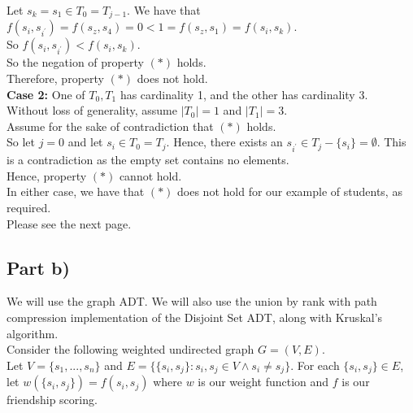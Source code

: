 \documentclass[12pt]{article}
\begin{document}
Let $s_k = s_1 \in T_0 = T_{j-1}$. We have that $f(s_i, s_{i^\prime}) = f(s_z,s_4) = 0 < 1 = f(s_z,s_1) = f(s_i,s_k)$. \\

So $f(s_i, s_{i^\prime}) < f(s_i,s_k)$. \\

So the negation of property $(*)$ holds. \\

Therefore, property $(*)$ does not hold. \\

\textbf{Case 2:} One of $T_0,T_1$ has cardinality 1, and the other has cardinality 3. \\

Without loss of generality, assume $|T_0| = 1$ and $|T_1| = 3$. \\

Assume for the sake of contradiction that  $(*)$ holds. \\

So let $j = 0$ and let $s_i \in T_0 = T_j$. Hence, there exists an $s_{i^\prime} \in T_j - \{s_i\} = \emptyset$. This is a contradiction as the empty set contains no elements. \\

Hence, property $(*)$ cannot hold. \\

In either case, we have that $(*)$ does not hold for our example of students, as required. \\

Please see the next page. 

\newpage


\subsection*{Part b)}

We will use the graph ADT. We will also use the union by rank with path compression implementation of the Disjoint Set ADT, along with Kruskal's algorithm. \\

Consider the following weighted undirected graph $G = (V, E)$. \\

Let $V = \{s_1,...,s_n\}$ and $E = \{\{s_i,s_j\}: s_i, s_j \in V \land s_i \neq s_j\}$. For each $\{s_i,s_j\} \in E$, let $w(\{s_i,s_j\}) = f(s_i,s_j)$ where $w$ is our weight function and $f$ is our friendship scoring. \\
\end{document}
